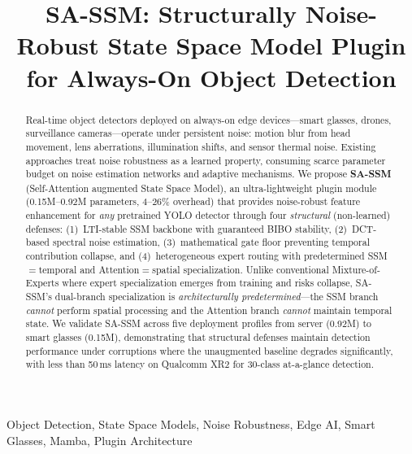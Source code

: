 \documentclass[conference]{IEEEtran}
\begin{document}
\title{SA-SSM: Structurally Noise-Robust State Space Model Plugin for Always-On Object Detection}

\author{
}

\maketitle

\begin{abstract}
Real-time object detectors deployed on always-on edge devices---smart glasses, drones, surveillance cameras---operate under persistent noise: motion blur from head movement, lens aberrations, illumination shifts, and sensor thermal noise. Existing approaches treat noise robustness as a learned property, consuming scarce parameter budget on noise estimation networks and adaptive mechanisms. We propose \textbf{SA-SSM} (Self-Attention augmented State Space Model), an ultra-lightweight plugin module (0.15M--0.92M parameters, 4--26\% overhead) that provides noise-robust feature enhancement for \emph{any} pretrained YOLO detector through four \emph{structural} (non-learned) defenses: (1)~LTI-stable SSM backbone with guaranteed BIBO stability, (2)~DCT-based spectral noise estimation, (3)~mathematical gate floor preventing temporal contribution collapse, and (4)~heterogeneous expert routing with predetermined SSM$=$temporal and Attention$=$spatial specialization. Unlike conventional Mixture-of-Experts where expert specialization emerges from training and risks collapse, SA-SSM's dual-branch specialization is \emph{architecturally predetermined}---the SSM branch \emph{cannot} perform spatial processing and the Attention branch \emph{cannot} maintain temporal state. We validate SA-SSM across five deployment profiles from server (0.92M) to smart glasses (0.15M), demonstrating that structural defenses maintain detection performance under corruptions where the unaugmented baseline degrades significantly, with less than 50\,ms latency on Qualcomm XR2 for 30-class at-a-glance detection.
\end{abstract}

\begin{IEEEkeywords}
Object Detection, State Space Models, Noise Robustness, Edge AI, Smart Glasses, Mamba, Plugin Architecture
\end{IEEEkeywords}
\end{document}

